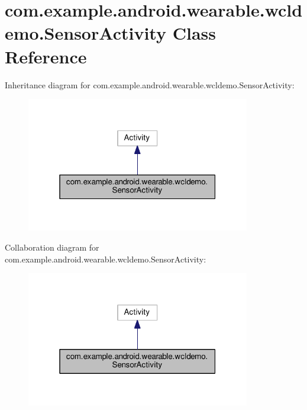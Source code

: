 \hypertarget{classcom_1_1example_1_1android_1_1wearable_1_1wcldemo_1_1SensorActivity}{}\section{com.\+example.\+android.\+wearable.\+wcldemo.\+Sensor\+Activity Class Reference}
\label{classcom_1_1example_1_1android_1_1wearable_1_1wcldemo_1_1SensorActivity}


Inheritance diagram for com.\+example.\+android.\+wearable.\+wcldemo.\+Sensor\+Activity\+:\nopagebreak
\begin{figure}[H]
\begin{center}
\leavevmode
\includegraphics[width=277pt]{d9/d35/classcom_1_1example_1_1android_1_1wearable_1_1wcldemo_1_1SensorActivity__inherit__graph}
\end{center}
\end{figure}


Collaboration diagram for com.\+example.\+android.\+wearable.\+wcldemo.\+Sensor\+Activity\+:\nopagebreak
\begin{figure}[H]
\begin{center}
\leavevmode
\includegraphics[width=277pt]{d2/d41/classcom_1_1example_1_1android_1_1wearable_1_1wcldemo_1_1SensorActivity__coll__graph}
\end{center}
\end{figure}
